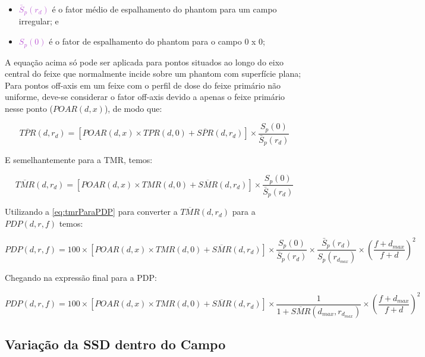 \documentclass[11pt,a4paper]{article}
\newcounter{exemplo}
\begin{document}
        \begin{exemplo}[onde]
            \begin{itemize}
                \item \textcolor{MediumOrchid}{$\bar{S}_p(r_d)$} é o fator médio de espalhamento do phantom para um campo irregular; e
                \item \textcolor{MediumOrchid}{$S_p(0)$} é o fator de espalhamento do phantom para o campo 0 x 0;
            \end{itemize}
        \end{exemplo}

        A equação acima só pode ser aplicada para pontos situados ao longo do eixo central do feixe que normalmente incide sobre um phantom com superfície plana; Para pontos off-axis em um feixe com o perfil de dose do feixe primário não uniforme, deve-se considerar o fator off-axis devido a apenas o feixe primário nesse ponto ($ POAR(d, x)$), de modo que:

        $$\overline{TPR}(d, r_d) = \left[POAR(d, x) \times TPR(d, 0) + \overline{SPR}(d, r_d)\right] \times \frac{S_p(0)}{\bar{S}_p(r_d)}$$

        E semelhantemente para a TMR, temos:
     
        $$\overline{TMR}(d, r_d) = \left[POAR(d, x) \times TMR(d, 0) + \overline{SMR}(d, r_d)\right] \times \frac{S_p(0)}{\bar{S}_p(r_d)}$$


       Utilizando a \ref{eq:tmrParaPDP} para converter a $\overline{TMR}(d,r_d)$ para a $PDP(d, r, f)$ temos:

        $$PDP(d, r, f) = 100 \times \left[POAR(d,x) \times TMR(d,0) + \overline{SMR}(d, r_d) \right] \times \frac{S_p(0)}{\bar{S}_p(r_d)} \times \frac{\bar{S}_p(r_d)}{S_p(r_{d_{max}})} \times \left(\frac{f + d_{max}}{f + d}\right)^2$$

        Chegando na expressão final para a PDP:

        \begin{equation}
            PDP(d, r, f) = 100 \times \left[POAR(d,x) \times TMR(d,0) + \overline{SMR}(d, r_d) \right] \times \frac{1}{1 + \overline{SMR}(d_{max}, r_{d_{max}})} \times \left(\frac{f + d_{max}}{f + d}\right)^2
        \end{equation}

    \subsection{Variação da SSD dentro do Campo}
\end{document}
